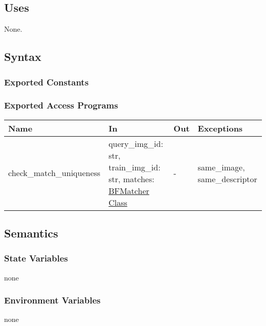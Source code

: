 \documentclass[12pt, titlepage]{article}
\begin{document}
\subsection{Uses}
None.

\subsection{Syntax}

\subsubsection{Exported Constants}

\subsubsection{Exported Access Programs}

\begin{center}
\begin{tabular}{p{4.5cm} p{4cm} p{4cm} p{3cm}}
\hline
\textbf{Name} & \textbf{In} & \textbf{Out} & \textbf{Exceptions} \\
\hline
check\_match\_uniqueness 
& query\_img\_id: str, \newline
train\_img\_id: str, \newline
matches: \href{https://docs.opencv.org/3.4/d3/da1/classcv_1_1BFMatcher.html}{BFMatcher Class}
& -  
& same\_image, \newline
same\_descriptor \\
\hline
\end{tabular}
\end{center}

\subsection{Semantics}

\subsubsection{State Variables}
none

\subsubsection{Environment Variables}
none
\end{document}
